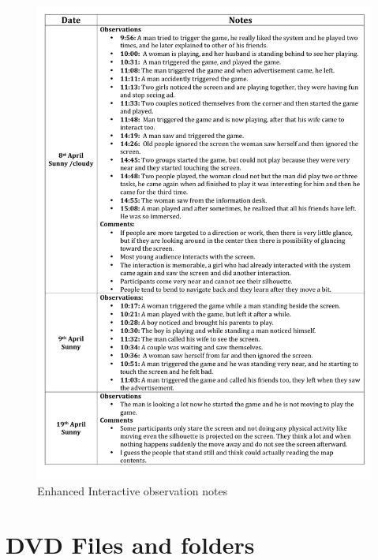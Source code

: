 \begin{appendices}
\begin{figure}[H]
 \centering 
    \includegraphics[width=\textwidth,height=0.8\textheight]{Appendices/9/Observation_notes.pdf}
    \caption{Enhanced Interactive observation notes}
     \label{app:EnhancedInteractiveobservationnotes}%
\end{figure}


\chapter{DVD Files and folders}
\setcounter{figure}{0}
\setcounter{table}{0}


\end{appendices}

